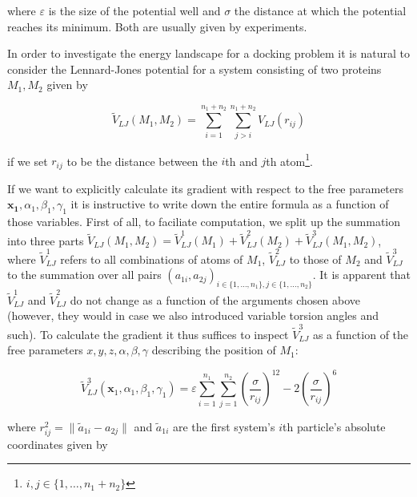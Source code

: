 where $\varepsilon$ is the size of the potential well and $\sigma$ the distance at which the potential reaches its minimum. Both are usually given by experiments.

In order to investigate the energy landscape for a docking problem it is natural to consider the Lennard-Jones potential for a system consisting of two proteins $M_1,M_2$ given by

\begin{equation}\label{LennardJonesOf2Proteins}
	\tilde V_{LJ}(M_1,M_2) = \sum_{i=1}^{n_1+n_2}\sum_{j>i}^{n_1+n_2} V_{LJ}(r_{ij})
\end{equation}

if we set $r_{ij}$ to be the distance between the $i$th and $j$th atom\footnote{$i,j\in\{1,\dots,n_1+n_2\}$}.

If we want to explicitly calculate its gradient with respect to the free parameters $\mathbf{x_1},\alpha_1,\beta_1,\gamma_1$ it is instructive to write down the entire formula as a function of those variables.
First of all, to faciliate computation, we split up the summation into three parts $\tilde V_{LJ}(M_1,M_2) = \tilde V_{LJ}^1(M_1)+\tilde V_{LJ}^2(M_2)+\tilde V_{LJ}^3(M_1,M_2)$, where $\tilde V_{LJ}^1$ refers to all combinations of atoms of $M_1$, $\tilde V_{LJ}^2$ to those of $M_2$ and $\tilde V_{LJ}^3$ to the summation over all pairs $(a_{1i},a_{2j})_{i\in\{1,\dots,n_1\}, j\in\{1,\dots,n_2\}}$.
It is apparent that $\tilde V_{LJ}^1$ and $\tilde V_{LJ}^2$ do not change as a function of the arguments chosen above (however, they would in case we also introduced variable torsion angles and such).
To calculate the gradient it thus suffices to inspect $\tilde V_{LJ}^3$ as a function of the free parameters $x,y,z,\alpha,\beta,\gamma$ describing the position of $M_1$:

\begin{equation}
	\tilde V_{LJ}^3(\mathbf x_1,\alpha_1,\beta_1,\gamma_1) = \varepsilon 
	\sum_{i=1}^{n_1}\sum_{j=1}^{n_2}\left(\frac{\sigma}{r_{ij}}\right)^{12} 
	- 2 \left(\frac{\sigma}{r_{ij}}\right)^6
\end{equation}

where $r_{ij}^2 = \|\tilde a_{1i}-a_{2j}\|$ and $\tilde a_{1i}$ are the first system's $i$th particle's absolute coordinates given by

